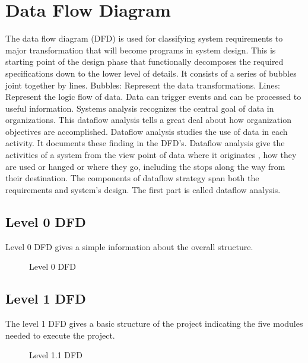 \documentclass[12pt,a4paper,oneside]{report}
\begin{document}
\section{Data Flow Diagram}
The data flow diagram (DFD) is used for classifying system requirements to major transformation that will become programs in system design. This is starting point of the design phase that functionally decomposes the required specifications down to the lower level of details. It consists of a series of bubbles joint together by lines.
Bubbles: Represent the data transformations.
Lines: Represent the logic flow of data.
Data can trigger events and can be processed to useful information. Systems analysis recognizes the central goal of data in organizations. This dataflow analysis tells a great deal about how organization objectives are accomplished.
Dataflow analysis studies the use of data in each activity. It documents these finding in the DFD’s. Dataflow analysis give the activities of a system from the view point of data where it originates , how they are used or hanged or where they go, including the stops along the way from their destination. The components of dataflow strategy span both the requirements and system’s design. The first part is called dataflow analysis.

\pagebreak

\subsection{Level 0 DFD}
Level 0 DFD gives a simple information about the overall structure.
\begin{figure}[h]
\begin{center}
\vspace{2 in}
\hspace{1 in}
\caption{Level 0 DFD}
\end{center}
\end{figure}
\pagebreak
\subsection{Level 1 DFD}
The level 1 DFD gives a basic structure of the project indicating the five modules needed to execute the project.
\begin{figure}[h]
\begin{center}
\vspace{2 in}
\hspace{1 in}
\caption{Level 1.1 DFD}
\end{center}
\vspace{-1.5 in}
\end{figure}
\end{document}
